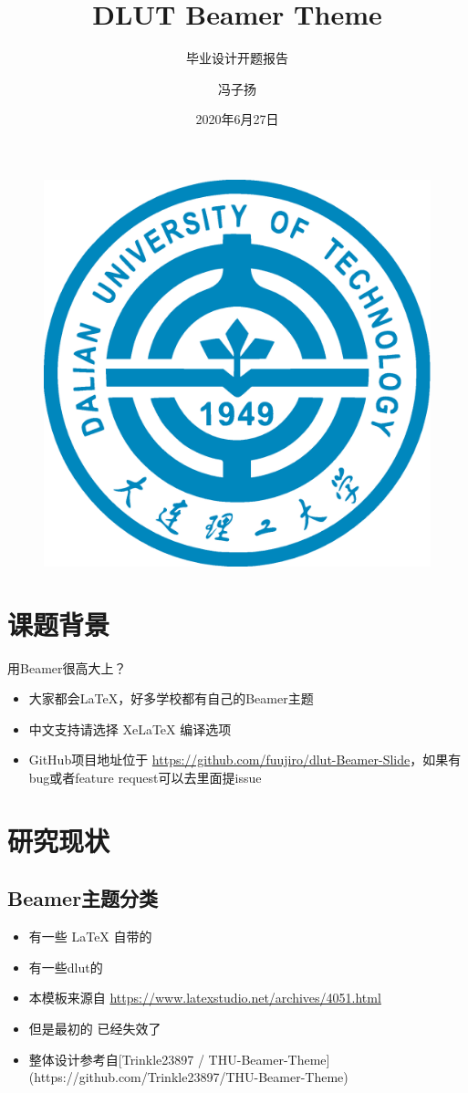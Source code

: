 \documentclass{beamer}
\author{冯子扬}
\title{DLUT Beamer Theme}
\subtitle{毕业设计开题报告}
\institute{大连理工大学 计算机科学与技术}
\date{2020年6月27日}
\begin{document}
\kaishu
\begin{frame}
    \titlepage
    \begin{figure}[htpb]
        \begin{center}
            \includegraphics[width=0.2\linewidth]{pic/DLUT-logo.eps}
        \end{center}
    \end{figure}
\end{frame}

\begin{frame}
    \tableofcontents[sectionstyle=show,subsectionstyle=show/shaded/hide,subsubsectionstyle=show/shaded/hide]
\end{frame}


\section{课题背景}

\begin{frame}{用Beamer很高大上？}
    \begin{itemize}[<+-| alert@+>] %
        \item 大家都会\LaTeX{}，好多学校都有自己的Beamer主题
        \item 中文支持请选择 Xe\LaTeX{} 编译选项
        \item GitHub项目地址位于 \url{https://github.com/fuujiro/dlut-Beamer-Slide}，如果有bug或者feature request可以去里面提issue
    \end{itemize}
\end{frame}


\section{研究现状}

\subsection{Beamer主题分类}

\begin{frame}
    \begin{itemize}
        \item 有一些 \LaTeX{} 自带的
        \item 有一些dlut的
        \item 本模板来源自 \newline \url{https://www.latexstudio.net/archives/4051.html}
        \item 但是最初的 \href{http://far.tooold.cn/post/latex/beamerdlut}{\color{purple}{link}} \cite{origin}已经失效了
        \item 整体设计参考自[Trinkle23897 / THU-Beamer-Theme](https://github.com/Trinkle23897/THU-Beamer-Theme)
    \end{itemize}
\end{frame}
\end{document}
